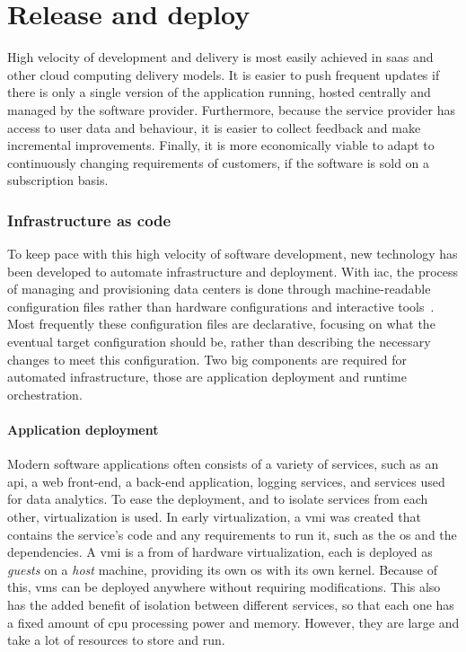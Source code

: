 \section{Release and deploy}

High velocity of development and delivery is most easily achieved in \gls{saas} and other cloud computing delivery models.
It is easier to push frequent updates if there is only a single version of the application running, hosted centrally and managed by the software provider.
Furthermore, because the service provider has access to user data and behaviour, it is easier to collect feedback and make incremental improvements.
Finally, it is more economically viable to adapt to continuously changing requirements of customers, if the software is sold on a subscription basis.

\subsubsection{Infrastructure as code}
To keep pace with this high velocity of software development, new technology has been developed to automate infrastructure and deployment.
With \gls{iac}, the process of managing and provisioning data centers is done through machine-readable configuration files rather than hardware configurations and interactive tools~\cite{wittig2018amazon}.
Most frequently these configuration files are declarative, focusing on what the eventual target configuration should be, rather than describing the necessary changes to meet this configuration.
Two big components are required for automated infrastructure, those are application deployment and runtime orchestration.

\paragraph{Application deployment}
Modern software applications often consists of a variety of services, such as an \gls{api}, a web front-end, a back-end application, logging services, and services used for data analytics.
To ease the deployment, and to isolate services from each other, virtualization is used.
In early virtualization, a \gls{vmi} was created that contains the service's code and any requirements to run it, such as the \gls{os} and the dependencies.
A \gls{vmi} is a from of hardware virtualization, each is deployed as \textit{guests} on a \textit{host} machine, providing its own \gls{os} with its own kernel.
Because of this, \glspl{vm} can be deployed anywhere without requiring modifications.
This also has the added benefit of isolation between different services, so that each one has a fixed amount of \gls{cpu} processing power and memory.
However, they are large and take a lot of resources to store and run.

